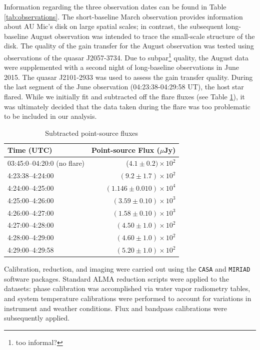 \documentclass[12pt,oneside]{book}
\begin{document}
Information regarding the three observation dates can be found in Table \ref{tab:observations}. 
The short-baseline March observation provides information about AU Mic's disk on large spatial scales; in contrast, the subsequent long-baseline August observation was intended to trace the small-scale structure of the disk. 
The quality of the gain transfer for the August observation was tested using observations of the quasar J2057-3734.
Due to subpar\footnote{too informal?} quality, the August data were supplemented with a second night of long-baseline observations in June 2015. 
The quasar J2101-2933 was used to assess the gain transfer quality.
During the last segment of the June observation (04:23:38-04:29:58 UT), the host star flared. While we initially fit and subtracted off the flare fluxes (see Table \ref{tab:flare fluxes}), it was ultimately decided that the data taken during the flare was too problematic to be included in our analysis.

\begin{table}	
  \centering
	\caption{Subtracted point-source fluxes}
  \label{tab:flare fluxes}
  \begin{tabular}{lr}
    \toprule
    Time (UTC) & Point-source Flux ($\mu$Jy) \\
    \midrule
    03:45:0--04:20:0 (no flare) & ($4.1 \pm 0.2)  \times 10^2$\\
  	4:23:38--4:24:00 & $(9.2 \pm 1.7) \times 10^2$ \\
  	4:24:00--4:25:00 & $(1.146 \pm 0.010) \times 10^4$ \\
  	4:25:00--4:26:00 & $(3.59 \pm 0.10) \times 10^3$ \\
  	4:26:00--4:27:00 & $(1.58 \pm 0.10) \times 10^3$ \\
  	4:27:00--4:28:00 & $(4.50 \pm 1.0) \times 10^2$ \\
  	4:28:00--4:29:00 & $(4.60 \pm 1.0) \times 10^2$ \\
  	4:29:00--4:29:58 & $(5.20 \pm 1.0) \times 10^2$\\
    \bottomrule
  \end{tabular}
\end{table}

Calibration, reduction, and imaging were carried out using the \texttt{CASA} and
\texttt{MIRIAD} software packages. Standard ALMA reduction scripts were applied
to the datasets: phase calibration was accomplished via water vapor radiometry
tables, and system temperature calibrations were performed to account for
variations in instrument and weather conditions. Flux and bandpass calibrations
were subsequently applied.
\end{document}
